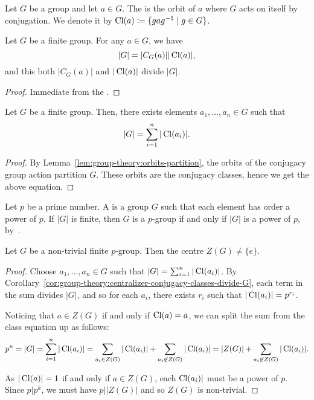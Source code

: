 \begin{definition}\label{def:group-theory:conjugacy-class}
  Let \(G\) be a group and let \(a \in G\). The  is the orbit of \(a\) where \(G\) acts on itself by conjugation. We denote it by \(\operatorname{Cl}(a) \coloneqq \{gag^{-1} \mid g \in G\}\).
\end{definition}

\begin{corollary}\label{cor:group-theory:centralizer-conjugacy-classes-divide-G}
  Let \(G\) be a finite group. For any \(a \in G\), we have
  \[|G| = |C_{G}(a)| |\operatorname{Cl}(a)|,\]
  and this both \(|C_{G}(a)|\) and \(|\operatorname{Cl}(a)|\) divide \(|G|\).
\end{corollary}

\begin{proof}
  Immediate from the .
\end{proof}

\begin{corollary}\label{cor:group-theory:class-equation}
  Let \(G\) be a finite group. Then, there exists elements \(a_{1}, \ldots, a_{n} \in G\) such that
  \[|G| = \sum_{i=1}^{n} |\operatorname{Cl}(a_{i})|.\]
\end{corollary}

\begin{proof}
  By Lemma~\ref{lem:group-theory:orbits-partition}, the orbits of the conjugacy group action partition \(G\). These orbits are the conjugacy classes, hence we get the above equation.
\end{proof}


\begin{definition}
  Let \(p\) be a prime number. A  is a group \(G\) such that each element has order a power of \(p\). If \(|G|\) is finite, then \(G\) is a \(p\)-group if and only if \(|G|\) is a power of \(p\), by~.
\end{definition}


\begin{theorem}\label{thm:group-theory:p-group-non-trivial-centre}
  Let \(G\) be a non-trivial finite \(p\)-group. Then the centre \(Z(G) \neq \{e\}\).
\end{theorem}

\begin{proof}
  Choose \(a_{1}, \ldots, a_{n} \in G\) such that \(|G| = \sum_{i=1}^{n} |\operatorname{Cl}(a_{i})|\). By Corollary~\ref{cor:group-theory:centralizer-conjugacy-classes-divide-G}, each term in the sum divides \(|G|\), and so for each \(a_{i}\), there exists \(r_{i}\) such that \(|\operatorname{Cl}(a_{i})| = p^{r_{i}}\).

  Noticing that \(a \in Z(G)\) if and only if \(\operatorname{Cl}(a) = {a}\), we can split the sum from the class equation up as follows:
  \[ p^{n} = |G| = \sum_{i=1}^{n} |\operatorname{Cl}(a_{i})| = \sum_{a_{i} \in Z(G)} |\operatorname{Cl}(a_{i})|+ \sum_{a_i \not\in Z(G)} |\operatorname{Cl}(a_{i})|= |Z(G)| + \sum_{a_i \not\in Z(G)}|\operatorname{Cl}(a_{i})|.\]

  As \(|\operatorname{Cl}(a)| = 1\) if and only if \(a \in Z(G)\), each \(\operatorname{Cl}(a_{i})|\) must be a power of \(p\). Since \(p | p^{k}\), we must have \(p | |Z(G)|\) and so \(Z(G)\) is non-trivial.
\end{proof}

